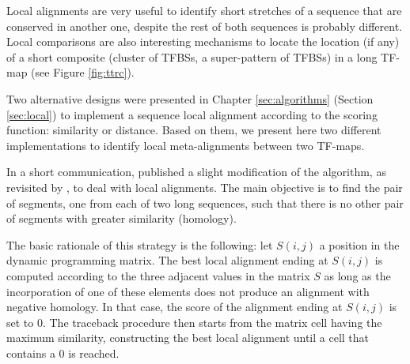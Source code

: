 
Local alignments are very useful to identify short stretches of a sequence that
are conserved in another one, despite the rest of both sequences is probably different. 
Local comparisons are also interesting mechanisms to locate the location (if any) of
a short composite (cluster of TFBSs, a super-pattern of TFBSs) in a long TF-map 
(see Figure \ref{fig:ttrc}). 

Two alternative designs were presented in Chapter \ref{sec:algorithms} (Section \ref{sec:local})
to implement a sequence local alignment according to the scoring function: similarity or
distance. Based on them, we present here two different implementations to identify local 
meta-alignments between two TF-maps.


In a short communication, \citet{smith:1981c} published a slight modification of the 
\citeauthor{needleman:1970a} algorithm, as revisited by \citet{smith:1981b}, to deal with 
local alignments. The main objective is to find the pair of segments, one from each of two 
long sequences, such that there is no other pair of segments with greater similarity (homology).

The basic rationale of this strategy is the following: let $S(i,j)$ a position in the dynamic
programming matrix. The best local alignment ending at $S(i,j)$ is computed according to the 
three adjacent values in the matrix $S$ as long as the incorporation of one of these elements 
does not produce an alignment with negative homology. In that case, the score of the alignment 
ending at $S(i,j)$ is set to $0$. The traceback procedure then starts from the matrix cell 
having the maximum similarity, constructing the best local alignment until a cell that contains
a $0$ is reached.

